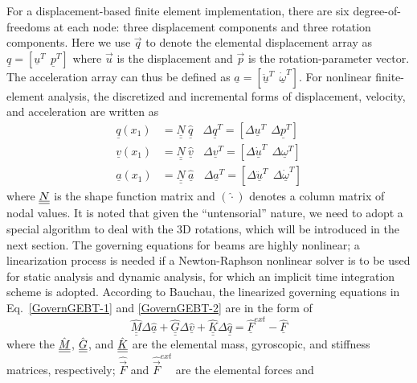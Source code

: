 For a displacement-based finite element implementation, there are six
degree-of-freedoms at each node: three displacement components and three
rotation components. Here we use $\vec{q}$ to denote the elemental
displacement array as $\underline{q}=\left[
\underline{u}^T~~\underline{p}^T\right]$ where $\vec{u}$ is the
displacement and $\vec{p}$ is the rotation-parameter vector. The
acceleration array can thus be defined as $\underline{a}=\left[
\ddot{\underline{u}}^T~~ \dot{\underline{\omega}}^T \right]$. For nonlinear
finite-element analysis, the discretized and incremental forms of
displacement, velocity, and acceleration are written as
\begin{align}
	\label{Discretized}
	\underline{q} (x_1) &= \underline{\underline{N}} ~\hat{\underline{q}}~~~~\Delta \underline{q}^T = \left[ \Delta \underline{u}^T~~\Delta \underline{p}^T \right] \\
	\underline{v}(x_1) &= \underline{\underline{N}}~\hat{\underline{v}}~~~~\Delta \underline{v}^T = \left[\Delta \underline{\dot{u}}^T~~\Delta \underline{\omega}^T \right] \\
	\underline{a}(x_1) &= \underline{\underline{N}}~ \hat{\underline{a}}~~~~\Delta \underline{a}^T = \left[ \Delta \ddot{\underline{u}}^T~~\Delta \dot{\underline{\omega}}^T \right]	
\end{align}
where $\underline{\underline{N}}$ is the shape function matrix and $(\hat{\cdot})$ denotes a
column matrix of nodal values. It is noted that given the ``untensorial''
nature, we need to adopt a special algorithm to deal with the 3D rotations,
which will be introduced in the next section.   The governing equations for
beams are highly nonlinear;  a linearization process is needed if a
Newton-Raphson nonlinear solver is to be used for static analysis and dynamic analysis, for which an implicit time integration scheme is adopted.
According to Bauchau\cite{Bauchau:2010}, the linearized governing equations
in Eq.~\eqref{GovernGEBT-1} and \eqref{GovernGEBT-2} are in the form of
\begin{equation}
	\label{LinearizedEqn}
	\hat{\underline{\underline{M}}} \Delta \hat{\underline{a}} +\hat{\underline{\underline{G}}} \Delta \hat{\underline{v}}+ \hat{\underline{\underline{K}}} \Delta \hat{\underline{q}} = \hat{\underline{F}}^{ext} - \hat{\underline{F}}
\end{equation} 
where the $\hat{\underline{\underline{M}}}$, $\hat{\underline{\underline{G}}}$, and $\hat{\underline{\underline{K}}}$ are the
elemental mass, gyroscopic, and stiffness matrices, respectively;
$\hat{\vec{F}}$ and $\hat{\vec{F}}^{ext}$ are the elemental forces and
